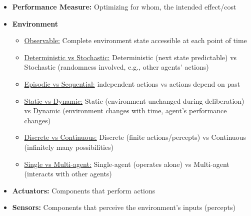 \documentclass[10pt,landscape]{article}
\makeatletter
\renewcommand{\subsubsection}{\@startsection{subsubsection}{3}{0mm}%
                                {-1ex plus -.5ex minus -.2ex}%
                                {1ex plus .2ex}%
                                {\normalfont\small\bfseries}}
\makeatother
\begin{document}
\begin{multicols*}{3}
\begin{itemize}[topsep=0pt,noitemsep,wide=0pt, leftmargin=\dimexpr{} + 2\relax]
  \item \textbf{Performance Measure:} Optimizing for whom, the intended effect/cost
  \item \textbf{Environment}
  \begin{itemize}[topsep=0pt,noitemsep,wide=0pt, leftmargin=\relax]
    \item \underline{Observable:} Complete environment state accessible at each point of time
    \item \underline{Deterministic vs Stochastic:} Deterministic (next state predictable) vs Stochastic (randomness involved, e.g., other agents' actions)
    \item \underline{Episodic vs Sequential:} independent actions vs actions depend on past
    \item \underline{Static vs Dynamic:} Static (environment unchanged during deliberation) vs Dynamic (environment changes with time, agent's performance changes)
    \item \underline{Discrete vs Continuous:} Discrete (finite actions/percepts) vs Continuous (infinitely many possibilities)
    \item \underline{Single vs Multi-agent:} Single-agent (operates alone) vs Multi-agent (interacts with other agents)
  \end{itemize}
  \item \textbf{Actuators:} Components that perform actions
  \item \textbf{Sensors:} Components that perceive the environment's inputs (percepts)
\end{itemize}

\end{multicols*}
\end{document}
